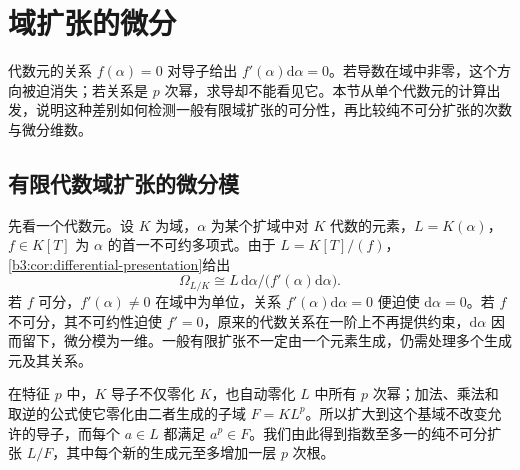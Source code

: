 
\section{域扩张的微分}
\label{b3:sec:1404}

代数元的关系 \(f(\alpha)=0\) 对导子给出 \(f'(\alpha)\mathrm{d}\alpha=0\)。若导数在域中非零，这个方向被迫消失；若关系是 \(p\) 次幂，求导却不能看见它。本节从单个代数元的计算出发，说明这种差别如何检测一般有限域扩张的可分性，再比较纯不可分扩张的次数与微分维数。

\subsection{有限代数域扩张的微分模}
\label{b3:subsec:1404:01}

先看一个代数元。设 \(K\) 为域，\(\alpha\) 为某个扩域中对 \(K\) 代数的元素，\(L=K(\alpha)\)，\(f\in K[T]\) 为 \(\alpha\) 的首一不可约多项式。由于 \(L=K[T]/(f)\)，\cref{b3:cor:differential-presentation}给出
\begin{equation}\label{b3:eq:simple-field-differentials}
	\Omega_{L/K}\cong L\,\mathrm{d}\alpha/\bigl(f'(\alpha)\mathrm{d}\alpha\bigr).
\end{equation}
若 \(f\) 可分，\(f'(\alpha)\ne0\) 在域中为单位，关系 \(f'(\alpha)\mathrm{d}\alpha=0\) 便迫使 \(\mathrm{d}\alpha=0\)。若 \(f\) 不可分，其不可约性迫使 \(f'=0\)，原来的代数关系在一阶上不再提供约束，\(\mathrm{d}\alpha\) 因而留下，微分模为一维。一般有限扩张不一定由一个元素生成，仍需处理多个生成元及其关系。

在特征 \(p\) 中，\(K\) 导子不仅零化 \(K\)，也自动零化 \(L\) 中所有 \(p\) 次幂；加法、乘法和取逆的公式使它零化由二者生成的子域 \(F=K L^p\)。所以扩大到这个基域不改变允许的导子，而每个 \(a\in L\) 都满足 \(a^p\in F\)。我们由此得到指数至多一的纯不可分扩张 \(L/F\)，其中每个新的生成元至多增加一层 \(p\) 次根。

